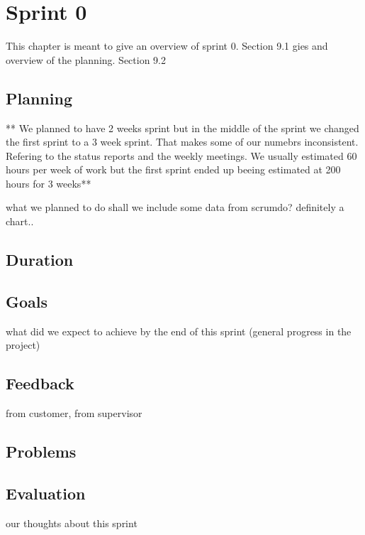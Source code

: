 
\chapter{Sprint 0} %

\label{Sprint 0} %

This chapter is meant to give an overview of sprint 0. 
Section 9.1 gies and overview of the planning.
Section 9.2

\section{Planning}

** We planned to have 2 weeks sprint but in the middle of the sprint we changed the first sprint to a 3 week sprint. That makes some of our numebrs inconsistent. Refering to the status reports and the weekly meetings. We usually estimated 60 hours per week of work but the first sprint ended up beeing estimated at 200 hours for 3 weeks**


what we planned to do
shall we include some data from scrumdo? definitely a chart..
\section{Duration}
\section{Goals}
what did we expect to achieve by the end of this sprint (general progress in the project)
\section{Feedback}
from customer, from supervisor
\section{Problems}

\section{Evaluation}
our thoughts about this sprint
